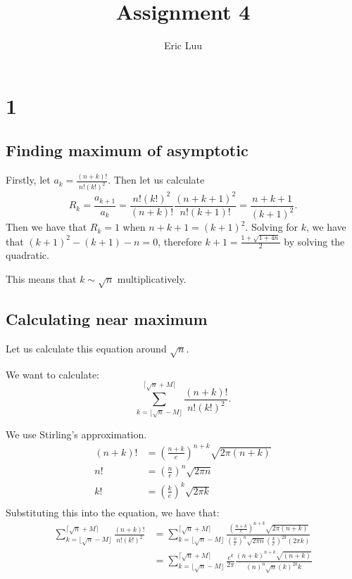 \documentclass[]{article}
\title{Assignment 4}
\author{Eric Luu}
\begin{document}
\maketitle
\section{1}
\subsection{Finding maximum of asymptotic}
Firstly, let $a_k = \frac{(n + k)!}{n!(k!)^2}$. Then let us calculate 
\begin{equation}
	R_k = \frac{a_{k + 1}}{a_k} = \frac{n!(k!)^2}{(n + k)!}\frac{(n + k + 1)^2}{n! (k + 1)!} = \frac{n + k + 1}{(k + 1)^2}. 
\end{equation}
Then we have that $R_k = 1$ when $n + k + 1 = (k + 1)^2$. Solving for $k$, we have that $(k + 1)^2 - (k + 1) - n = 0$, therefore $k + 1 = \frac{1 + \sqrt{1 + 4n}}{2}$ by solving the quadratic.

This means that $k \sim \sqrt{n}$ multiplicatively. 

\subsection{Calculating near maximum}
Let us calculate this equation around $\sqrt{n}$. 

We want to calculate:
\begin{equation}
	\sum_{k = \lfloor \sqrt{n} - M \rfloor }^{ \lceil \sqrt{n} + M \rceil}  \frac{(n + k)!}{n!(k!)^2}.
\end{equation}

We use Stirling's approximation.
\begin{align*}
	(n + k)! &= \left(\frac{n + k}{e}\right)^{n + k}\sqrt{2\pi (n + k)}\\
	n! &= \left(\frac{n}{e}\right)^n \sqrt{2 \pi n}\\
	k! &= \left(\frac{k}{e}\right)^k \sqrt{2 \pi k}\\
\end{align*}
Substituting this into the equation, we have that:
\begin{align*}
	\sum_{k = \lfloor \sqrt{n} - M \rfloor }^{ \lceil \sqrt{n} + M \rceil}  \frac{(n + k)!}{n!(k!)^2}
	&=
	\sum_{k = \lfloor \sqrt{n} - M \rfloor }^{ \lceil \sqrt{n} + M \rceil} \frac{\left(\frac{n + k}{e}\right)^{n + k}\sqrt{2\pi (n + k)}}{\left(\frac{n}{e}\right)^n \sqrt{2 \pi n} \left(\frac{k}{e}\right)^{2k} (2 \pi k)}\\
	&=
	\sum_{k = \lfloor \sqrt{n} - M \rfloor }^{ \lceil \sqrt{n} + M \rceil} \frac{e^{k}}{2\pi} \frac{\left(n + k\right)^{n + k}\sqrt{(n + k)}}{\left(n\right)^n \sqrt{n} \left(k\right)^{2k}k }\\
\end{align*}
\end{document}
